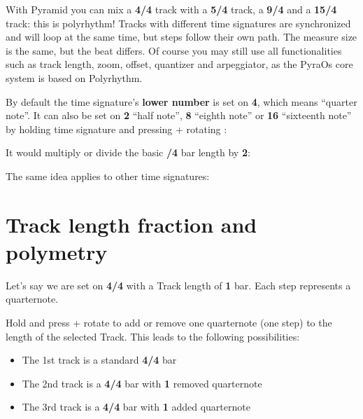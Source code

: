 With Pyramid you can mix a \textbf{4/4} track with a \textbf{5/4} track, a \textbf{9/4} and a \textbf{15/4} track: this is polyrhythm! Tracks with different time signatures are synchronized and will loop at the same time, but steps follow their own path. The measure size is the same, but the beat differs. Of course you may still use all functionalities such as track length, zoom, offset, quantizer and arpeggiator, as the PyraOs core system is based on Polyrhythm.

By default the time signature's \textbf{lower number} is set on \textbf{4}, which means ``quarter note''. It can also be set on \textbf{2} ``half note'', \textbf{8} ``eighth note'' or \textbf{16} ``sixteenth note'' by holding time signature and pressing + rotating \encodericon{}:


It would multiply or divide the basic \textbf{/4} bar length by \textbf{2}:


The same idea applies to other time signatures:




\section{Track length fraction and polymetry}

Let's say we are set on \textbf{4/4} with a Track length of \textbf{1} bar. Each step represents a quarternote.

Hold  and press + rotate \encodericon{} to add or remove one quarternote (one step) to the length of the selected Track. This leads to the following possibilities:


\begin{itemize}
\item The 1st track is a standard \textbf{4/4} bar
\item The 2nd track is a \textbf{4/4} bar with \textbf{1} removed quarternote
\item The 3rd track is a \textbf{4/4} bar with \textbf{1} added quarternote
\end{itemize}

